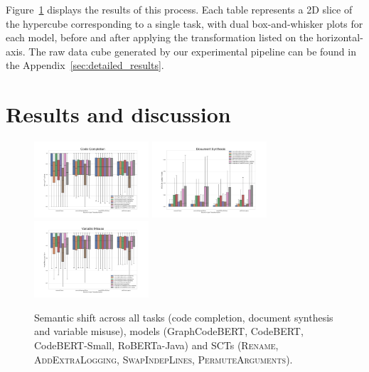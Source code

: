 \documentclass[usenames,dvipsnames]{article} %
\begin{document}
  Figure~\ref{fig:semantic_drift} displays the results of this process. Each table represents a 2D slice of the hypercube corresponding to a single task, with dual box-and-whisker plots for each model, before and after applying the transformation listed on the horizontal-axis. The raw data cube generated by our experimental pipeline can be found in the Appendix~\ref{sec:detailed_results}.

  \section{Results and discussion}\label{sec:results}

  \vspace{-10pt}\begin{figure}[H]
          \centering\hspace*{-0.6cm}
          \includegraphics[width=0.38\textwidth]{figs/Code Completion}\hspace*{-0.6cm}
          \includegraphics[width=0.38\textwidth]{figs/Document Synthesis}\hspace*{-0.6cm}
          \includegraphics[width=0.38\textwidth]{figs/Variable Misuse}
          \caption{Semantic shift across all tasks (code completion, document synthesis and variable misuse), models (GraphCodeBERT, CodeBERT, CodeBERT-Small, RoBERTa-Java) and SCTs (\textsc{Rename}, \textsc{AddExtraLogging}, \textsc{SwapIndepLines}, \textsc{PermuteArguments}).}
      \label{fig:semantic_drift}
  \end{figure}
\end{document}
